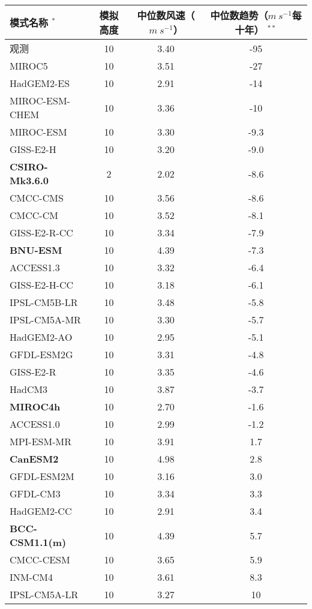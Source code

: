 \begin{table}[!htbp]
    \label{tab:GCMoutputs}
    \centering
    \small%
    \setlength{\tabcolsep}{5 pt}%
    \renewcommand{\arraystretch}{1.0}%
    \begin{tabular}{lccc}
        \hline
         模式名称  $^{*}$& 模拟高度 & 中位数风速（$m ~ s^{-1}$） & 中位数趋势（$m ~ s^{-1}$每十年） $^{**}$\\
        \hline
        观测 & 10 & 3.40 & -95 \\
        MIROC5 & 10 & 3.51 & -27 \\
        HadGEM2-ES & 10 & 2.91 & -14 \\
        MIROC-ESM-CHEM & 10 & 3.36 & -10\\
        MIROC-ESM & 10 & 3.30 & -9.3 \\
        GISS-E2-H & 10 & 3.20 & -9.0 \\
        \textbf{CSIRO-Mk3.6.0} & 2 & 2.02 & -8.6 \\
        CMCC-CMS & 10 & 3.56 & -8.6 \\
        CMCC-CM & 10 & 3.52 & -8.1 \\
        GISS-E2-R-CC & 10 & 3.34 & -7.9 \\
        \textbf{BNU-ESM} & 10 & 4.39 & -7.3 \\
        ACCESS1.3 & 10 & 3.32 & -6.4 \\
        GISS-E2-H-CC & 10 & 3.18 & -6.1 \\
        IPSL-CM5B-LR & 10 & 3.48 & -5.8 \\
        IPSL-CM5A-MR & 10 & 3.30 & -5.7 \\
        HadGEM2-AO & 10 & 2.95 & -5.1 \\
        GFDL-ESM2G & 10 & 3.31 & -4.8 \\
        GISS-E2-R & 10 & 3.35 & -4.6 \\
        HadCM3 & 10 & 3.87 & -3.7 \\
        \textbf{MIROC4h} & 10 & 2.70 & -1.6 \\
        ACCESS1.0 & 10 & 2.99 &  -1.2 \\
        MPI-ESM-MR & 10 & 3.91 & 1.7 \\
        \textbf{CanESM2} & 10 & 4.98 & 2.8 \\
        GFDL-ESM2M & 10 & 3.16 & 3.0 \\    
        GFDL-CM3 & 10 & 3.34 & 3.3 \\
        HadGEM2-CC & 10 & 2.91 & 3.4 \\
        \textbf{BCC-CSM1.1(m)} & 10 & 4.39 & 5.7 \\
        CMCC-CESM & 10 & 3.65 & 5.9 \\
        INM-CM4 & 10 & 3.61 & 8.3 \\
        IPSL-CM5A-LR & 10 & 3.27 & 10 \\
        \hline
	\end{tabular}
\end{table}
